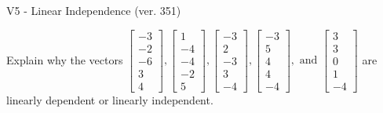 \begin{exercise}
  \begin{exerciseTitle}V5 - Linear Independence (ver. 351)\end{exerciseTitle}
  \begin{exerciseStatement}
    Explain why the vectors \(\left[\begin{array}{r}
-3 \\
-2 \\
-6 \\
3 \\
4
\end{array}\right] , \left[\begin{array}{r}
1 \\
-4 \\
-4 \\
-2 \\
5
\end{array}\right] , \left[\begin{array}{r}
-3 \\
2 \\
-3 \\
3 \\
-4
\end{array}\right] , \left[\begin{array}{r}
-3 \\
5 \\
4 \\
4 \\
-4
\end{array}\right] , \text{ and } \left[\begin{array}{r}
3 \\
3 \\
0 \\
1 \\
-4
\end{array}\right]\) are linearly dependent or linearly independent.	



\end{exerciseStatement}
\end{exercise}
